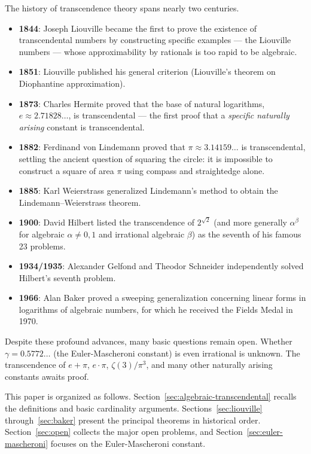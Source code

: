 \documentclass[12pt,a4paper]{amsart}
\theoremstyle{definition}
\begin{document}
The history of transcendence theory spans nearly two centuries.
\begin{itemize}[leftmargin=2em]
  \item \textbf{1844}: Joseph Liouville became the first to prove the existence
        of transcendental numbers by constructing specific examples — the
        Liouville numbers — whose approximability by rationals is too rapid to
        be algebraic.
  \item \textbf{1851}: Liouville published his general criterion (Liouville's
        theorem on Diophantine approximation).
  \item \textbf{1873}: Charles Hermite proved that the base of natural
        logarithms, $e \approx 2.71828\ldots$, is transcendental — the first
        proof that a \emph{specific naturally arising} constant is transcendental.
  \item \textbf{1882}: Ferdinand von Lindemann proved that $\pi \approx
        3.14159\ldots$ is transcendental, settling the ancient question of
        squaring the circle: it is impossible to construct a square of area
        $\pi$ using compass and straightedge alone.
  \item \textbf{1885}: Karl Weierstrass generalized Lindemann's method to
        obtain the Lindemann--Weierstrass theorem.
  \item \textbf{1900}: David Hilbert listed the transcendence of $2^{\sqrt{2}}$
        (and more generally $\alpha^\beta$ for algebraic $\alpha \neq 0,1$ and
        irrational algebraic $\beta$) as the seventh of his famous 23 problems.
  \item \textbf{1934/1935}: Alexander Gelfond and Theodor Schneider
        independently solved Hilbert's seventh problem.
  \item \textbf{1966}: Alan Baker proved a sweeping generalization concerning
        linear forms in logarithms of algebraic numbers, for which he received
        the Fields Medal in 1970.
\end{itemize}

Despite these profound advances, many basic questions remain open.
Whether $\gamma = 0.5772\ldots$ (the Euler-Mascheroni constant) is even
irrational is unknown. The transcendence of $e + \pi$, $e \cdot \pi$,
$\zeta(3)/\pi^3$, and many other naturally arising constants awaits proof.

This paper is organized as follows. Section~\ref{sec:algebraic-transcendental}
recalls the definitions and basic cardinality arguments. Sections~\ref{sec:liouville}
through~\ref{sec:baker} present the principal theorems in historical order.
Section~\ref{sec:open} collects the major open problems, and
Section~\ref{sec:euler-mascheroni} focuses on the Euler-Mascheroni constant.
\end{document}
